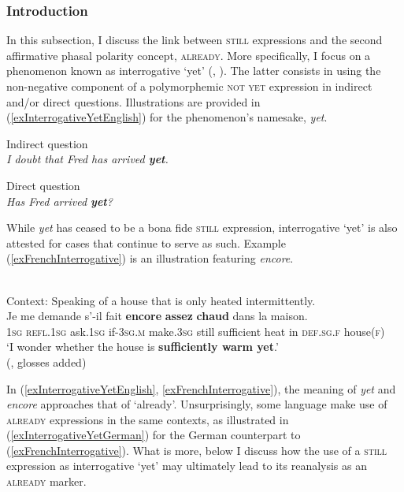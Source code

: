 \subsubsection{Introduction}\largerpage[2]
In this subsection, I discuss the link between \textsc{still} expressions and the second affirmative phasal polarity concept, \textsc{already}. More specifically, I focus on a phenomenon known as interrogative \lq{}yet\rq{} (\cite{vanderAuwera1993}, \citeyear[92–98]{vanderAuwera1998}). The latter consists in using the non-negative component of a polymorphemic \textsc{not yet} expression in indirect and/or direct questions. Illustrations are provided in (\ref{exInterrogativeYetEnglish}) for the phenomenon's namesake,  \textit{yet}.

\begin{exe}
	\ex  \label{exInterrogativeYetEnglish}
	\begin{xlist}
		\exi{}
		\ex Indirect question\\
	\textit{I doubt that Fred has arrived \textbf{yet}.}
	
		\ex Direct question\\
		\textit{Has Fred arrived \textbf{yet}?}
	\end{xlist}
\end{exe}

While  \textit{yet} has ceased to be a bona fide \textsc{still} expression, interrogative \lq yet\rq{} is also attested for cases that continue to serve as such. Example (\ref{exFrenchInterrogative}) is an illustration featuring  \textit{encore}.\largerpage[2]

\begin{exe}
	\ex \label{exFrenchInterrogative} \\
	Context: Speaking of a house that is only heated intermittently.\\
	\gll Je me demande s'-il fait \textbf{encore} \textbf{assez} \textbf{chaud} dans la maison.\\
1\textsc{sg} \textsc{refl}.1\textsc{sg} ask.1\textsc{sg} if-3\textsc{sg}.\textsc{m} make.3\textsc{sg} still sufficient heat in \textsc{def}.\textsc{sg}.\textsc{f} house(\textsc{f})\\
	\glt \lq I wonder whether the house is \textbf{sufficiently warm yet}.'
	\\(\cite[178]{Martin1980}, glosses added)
\end{exe}

In (\ref{exInterrogativeYetEnglish}, \ref{exFrenchInterrogative}), the meaning of \textit{yet} and \textit{encore} approaches that of \lq already\rq{}. Unsurprisingly, some language make use of \textsc{already} expressions in the same contexts, as illustrated in (\ref{exInterrogativeYetGerman}) for the German counterpart to (\ref{exFrenchInterrogative}). What is more, below I discuss how the use of a \textsc{still} expression as interrogative \lq yet\rq{ }may ultimately lead to its reanalysis as an \textsc{already} marker.

